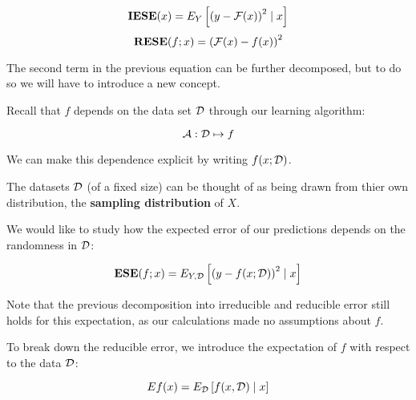 %
%
\begin{frame}
  $$ \operatorname*{\mathbf{IESE}}(x) = E_Y \left[ \left( y - \operatorname*{\mathcal{F}}(x) \right)^2 \mid x \right] $$
  $$ \operatorname*{\mathbf{RESE}}(f; x) = \left( \operatorname*{\mathcal{F}}(x) - f(x) \right)^2 $$
\end{frame}
%
%
\begin{frame}
  The second term in the previous equation can be further decomposed, but to do
  so we will have to introduce a new concept.  
\end{frame}
%
%
\begin{frame}
  Recall that $f$ depends on the data set $\operatorname*{\mathcal{D}}$ through our learning algorithm:

  $$ \operatorname*{\mathcal{A}} : \operatorname*{\mathcal{D}} \mapsto f $$

  We can make this dependence explicit by writing $f(x; \operatorname*{\mathcal{D}})$.
\end{frame}
%
%
\begin{frame}
  The datasets $\operatorname*{\mathcal{D}}$ (of a fixed size) can be thought of as being drawn from
  thier own distribution, the \textbf{sampling distribution} of $X$.   
\end{frame}
%
%
\begin{frame}
  We would like to study how the expected error of our predictions depends on
  the randomness in $\operatorname*{\mathcal{D}}$:

  $$ \operatorname*{\mathbf{ESE}}(f; x) = E_{Y,\operatorname*{\mathcal{D}}} \left[ \left( y - f(x; \operatorname*{\mathcal{D}}) \right)^2 \mid x \right]
  $$

  Note that the previous decomposition into irreducible and reducible error
  still holds for this expectation, as our calculations made no assumptions
  about $f$.
\end{frame}
%
%
\begin{frame}
  To break down the reducible error, we introduce the expectation of $f$ with
  respect to the data $\operatorname*{\mathcal{D}}$:

  $$ Ef(x) = E_{\operatorname*{\mathcal{D}}} \left[ f(x, \operatorname*{\mathcal{D}}) \mid x \right] $$
\end{frame}
%
%
